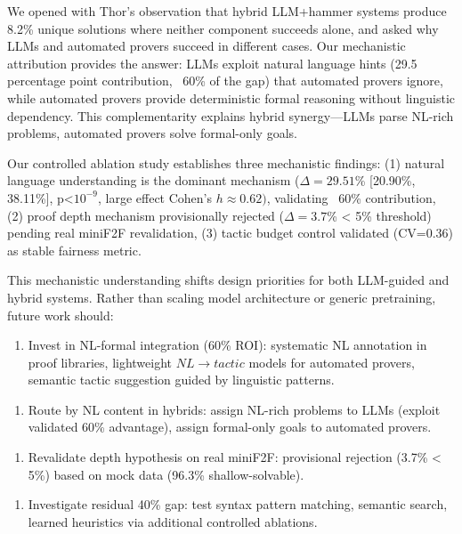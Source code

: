 
We opened with Thor's observation that hybrid LLM+hammer systems produce 8.2\% unique solutions where neither component succeeds alone, and asked why LLMs and automated provers succeed in different cases. Our mechanistic attribution provides the answer: LLMs exploit natural language hints (29.5 percentage point contribution, ~60\% of the gap) that automated provers ignore, while automated provers provide deterministic formal reasoning without linguistic dependency. This complementarity explains hybrid synergy---LLMs parse NL-rich problems, automated provers solve formal-only goals.

Our controlled ablation study establishes three mechanistic findings: (1) natural language understanding is the dominant mechanism ($\Delta =29.51$\% [20.90\%, 38.11\%], p<$10^{-9}$, large effect Cohen's $h\approx 0.62)$, validating ~60\% contribution, (2) proof depth mechanism provisionally rejected ($\Delta =3.7$\% < 5\% threshold) pending real miniF2F revalidation, (3) tactic budget control validated (CV=0.36) as stable fairness metric.

This mechanistic understanding shifts design priorities for both LLM-guided and hybrid systems. Rather than scaling model architecture or generic pretraining, future work should:

\begin{enumerate}
\item Invest in NL-formal integration (60\% ROI): systematic NL annotation in proof libraries, lightweight $NL\rightarrow tactic$ models for automated provers, semantic tactic suggestion guided by linguistic patterns.
\end{enumerate}

\begin{enumerate}
\item Route by NL content in hybrids: assign NL-rich problems to LLMs (exploit validated 60\% advantage), assign formal-only goals to automated provers.
\end{enumerate}

\begin{enumerate}
\item Revalidate depth hypothesis on real miniF2F: provisional rejection (3.7\% < 5\%) based on mock data (96.3\% shallow-solvable).
\end{enumerate}

\begin{enumerate}
\item Investigate residual 40\% gap: test syntax pattern matching, semantic search, learned heuristics via additional controlled ablations.
\end{enumerate}

